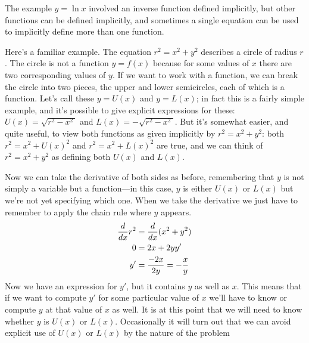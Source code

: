 The example $y=\ln x$ involved an inverse function defined implicitly,
but other functions can be defined implicitly, and sometimes a single
equation can be used to implicitly define more than one
function. 

Here's a familiar example. The equation $r^2=x^2+y^2$
describes a circle of radius $r$. The circle is not a function
$y=f(x)$ because for some values of $x$ there are two corresponding
values of $y$. If we want to work with a function, we can break the
circle into two pieces, the upper and lower semicircles, each of which
is a function. Let's call these $y=U(x)$ and $y=L(x)$; in fact this is
a fairly simple example, and it's possible to give explicit
expressions for these: $U(x)=\sqrt{r^2-x^2\ }$ and
$L(x)=-\sqrt{r^2-x^2\ }$.  But it's somewhat easier, and quite useful,
to view both functions as given implicitly by $r^2=x^2+y^2$: both
$r^2=x^2+U(x)^2$ and $r^2=x^2+L(x)^2$ are true, and we can think of 
$r^2=x^2+y^2$ as defining both $U(x)$ and $L(x)$.

Now we can take the derivative of both sides as before, remembering
that $y$ is not simply a variable but a function---in this case, $y$
is either $U(x)$ or $L(x)$ but we're not yet specifying which one.
When we take the derivative we just have to remember to apply the
chain rule where $y$ appears.
\begin{align*}
{d\over dx}r^2&={d\over dx}(x^2+y^2) \\
0&=2x+2yy' \\
y'&={-2x\over 2y}=-{x\over y} \\
\end{align*}
Now we have an expression for $y'$, but it contains $y$ as well as
$x$. This means that if we want to compute $y'$ for some particular
value of $x$ we'll have to know or compute $y$ at that value of $x$ as
well. It is at this point that we will need to know whether $y$ is
$U(x)$ or $L(x)$. Occasionally it will turn out that we can avoid
explicit use of $U(x)$ or $L(x)$ by the nature of the problem

